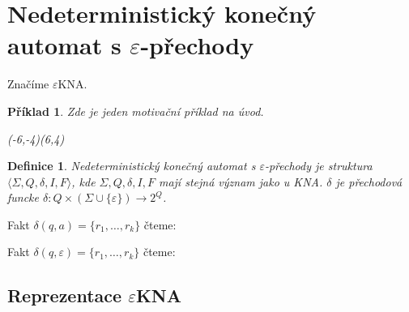 \documentclass[10pt, a4paper, titlepage]{article}
\theoremstyle{note}
\newtheorem{definice}{\textbf{Definice}}
\newtheorem{priklad}{\textbf{Příklad}}
\newcommand{\ekna}{$\varepsilon$KNA} %
\begin{document}
\section{Nedeterministický konečný automat s $\varepsilon$-přechody}
Značíme \ekna.
\begin{priklad}\label{priklad-5}
Zde je jeden motivační příklad na úvod.

\begin{center}
\begin{VCPicture}{(-6,-4)(6,4)}
\end{VCPicture}
\end{center}

\end{priklad}

\begin{definice}
Nedeterministický konečný automat s $\varepsilon$-přechody je struktura $ \langle \Sigma,Q,\delta,I,F \rangle $, kde $\Sigma,Q,\delta,I,F$ mají stejná význam jako u KNA. $\delta$ je přechodová funcke $\delta : Q \times (\Sigma \cup \lbrace \varepsilon \rbrace ) \rightarrow 2^Q$.
\end{definice}

Fakt $\delta (q,a) = \lbrace r_1,\ldots,r_k \rbrace $ čteme: 

Fakt $\delta (q,\varepsilon) = \lbrace r_1,\ldots,r_k \rbrace $ čteme: 

\subsection{Reprezentace \ekna}
\end{document}
